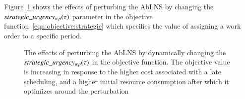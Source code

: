 Figure~\ref{fig:responses:value_change} shows the effects of
perturbing the AbLNS by changing the $strategic\_urgency_{w p}(\tau)$ parameter in the objective
function~\ref{eqn:objective:strategic} which specifies the value of assigning a
work order to a specific period.

\begin{figure}[H]%
	\centering
	\resizebox{\linewidth}{!}{
		
	}
	\caption{The effects of perturbing the AbLNS by dynamically changing the
		$strategic\_urgency_{w p}(\tau)$ in the objective function. The objective value
		is increasing in response to the higher cost associated with a late
		scheduling, and a higher initial resource consumption
		after which it optimizes around the perturbation
	}\label{fig:responses:value_change}
\end{figure}
 
